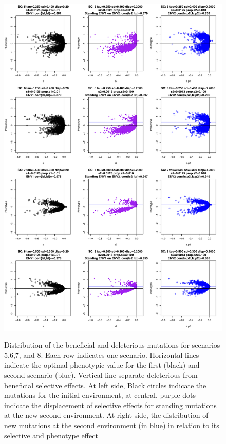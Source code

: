 \documentclass[a4paper,11pt]{article}
\begin{document}
\begin{figure}[h]
{\includegraphics[scale=0.45]{./Dist_ALLScenarios2.pdf}}
\caption{Distribution of the beneficial and deleterious mutations for scenarios 5,6,7, and 8. Each row indicates one scenario. Horizontal lines indicate the optimal phenotypic value for the first (black) and second scenario (blue). Vertical line separate deleterious from beneficial selective effects. At left side, Black circles indicate the mutations for the initial environment, at central, purple dots indicate the displacement of selective effects for standing mutations at the new second environment.  At right side, the distribution of new mutations at the second environment (in blue) in relation to its selective and phenotype effect}
\label{DistALLScenarios2}
\hspace*{-0.5cm}
\end{figure}
\end{document}
